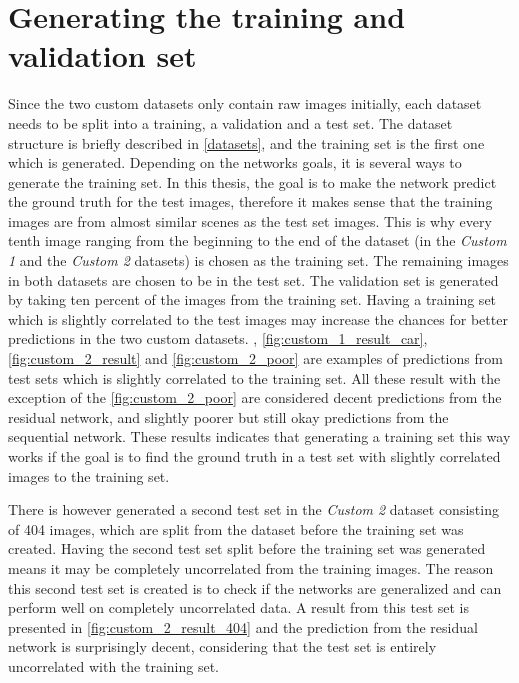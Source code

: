 \documentclass[USenglish]{ifimaster}  %
\begin{document}
\section{Generating the training and validation set}
Since the two custom datasets only contain raw images initially, each dataset needs to be split into a training, a validation and a test set. The dataset structure is briefly described in \cref{datasets}, and the training set is the first one which is generated. Depending on the networks goals, it is several ways to generate the training set. In this thesis, the goal is to make the network predict the ground truth for the test images, therefore it makes sense that the training images are from almost similar scenes as the test set images. This is why every tenth image ranging from the beginning to the end of the dataset (in the \textit{Custom 1} and the \textit{Custom 2} datasets) is chosen as the training set. The remaining images in both datasets are chosen to be in the test set. The validation set is generated by taking ten percent of the images from the training set. Having a training set which is slightly correlated to the test images may increase the chances for better predictions in the two custom datasets. , \cref{fig:custom_1_result_car}, \cref{fig:custom_2_result} and \cref{fig:custom_2_poor} are examples of predictions from test sets which is slightly correlated to the training set. All these result with the exception of the \cref{fig:custom_2_poor} are considered decent predictions from the residual network, and slightly poorer but still okay predictions from the sequential network. These results indicates that generating a training set this way works if the goal is to find the ground truth in a test set with slightly correlated images to the training set. 

There is however generated a second test set in the \textit{Custom 2} dataset consisting of 404 images, which are split from the dataset before the training set was created. Having the second test set split before the training set was generated means it may be completely uncorrelated from the training images. The reason this second test set is created is to check if the networks are generalized and can perform well on completely uncorrelated data. A result from this test set is presented in \cref{fig:custom_2_result_404} and the prediction from the residual network is surprisingly decent, considering that the test set is entirely uncorrelated with the training set.         
\end{document}
